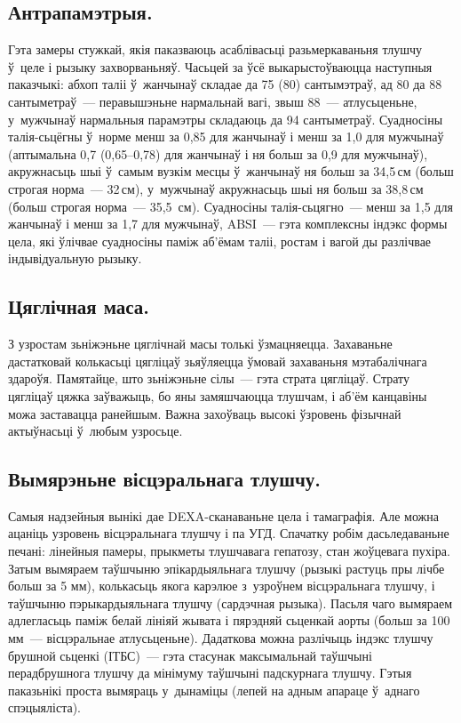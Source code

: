 \subsection{Антрапамэтрыя.}
Гэта замеры стужкай, якія паказваюць асаблівасьці разьмеркаваньня тлушчу ў~целе і рызыку захворваньняў. Часьцей за ўсё выкарыстоўваюцца наступныя паказчыкі: абхоп таліі ў~жанчынаў складае да 75 (80) сантымэтраў, ад 80 да 88 сантыметраў~--- перавышэньне нармальнай вагі, звыш 88~--- атлусьценьне, у~мужчынаў нармальныя парамэтры складаюць да 94 сантыметраў. Суадносіны талія-сьцёгны ў~норме менш за 0,85 для жанчынаў і менш за 1,0 для мужчынаў (аптымальна 0,7 (0,65--0,78) для жанчынаў і ня больш за 0,9 для мужчынаў), акружнасьць шыі ў~самым вузкім месцы ў~жанчынаў ня больш за 34,5\,см (больш строгая норма~--- 32\,см), у~мужчынаў акружнасьць шыі ня больш за 38,8\,см (больш строгая норма~--- 35,5~см). Суадносіны талія-сьцягно~--- менш за 1,5 для жанчынаў і менш за 1,7 для мужчынаў, ABSI~--- гэта комплексны індэкс формы цела, які ўлічвае суадносіны паміж аб'ёмам таліі, ростам і вагой ды разлічвае індывідуальную рызыку.

\subsection{Цяглічная маса.}
З узростам зьніжэньне цяглічнай масы толькі ўзмацняецца. Захаваньне дастатковай колькасьці цягліцаў зьяўляецца ўмовай захаваньня мэтабалічнага здароўя. Памятайце, што зьніжэньне сілы~--- гэта страта цягліцаў. Страту цягліцаў цяжка заўважыць, бо яны замяшчаюцца тлушчам, і аб'ём канцавіны можа заставацца ранейшым. Важна захоўваць высокі ўзровень фізычнай актыўнасьці ў~любым узросьце.

\subsection{Вымярэньне вісцэральнага тлушчу.}
Самыя надзейныя вынікі дае DEXA-сканаваньне цела і тамаграфія. Але можна ацаніць узровень вісцэральнага тлушчу і па УГД. Спачатку робім дасьледаваньне печані: лінейныя памеры, прыкметы тлушчавага гепатозу, стан жоўцевага пухіра. Затым вымяраем таўшчыню эпікардыяльнага тлушчу (рызыкі растуць пры лічбе больш за 5 мм), колькасьць якога карэлюе з~узроўнем вісцэральнага тлушчу, і таўшчыню пэрыкардыяльнага тлушчу (сардэчная рызыка). Пасьля чаго вымяраем адлегласьць паміж белай лініяй жывата і пярэдняй сьценкай аорты (больш за 100 мм~--- вісцэральнае атлусьценьне). Дадаткова можна разлічыць індэкс тлушчу брушной сьценкі (ІТБС)~--- гэта стасунак максымальнай таўшчыні перадбрушнога тлушчу да мінімуму таўшчыні падскурнага тлушчу. Гэтыя паказьнікі проста вымяраць у~дынаміцы (лепей на адным апараце ў~аднаго спэцыяліста).

